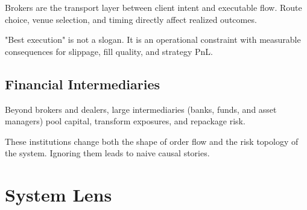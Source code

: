 Brokers are the transport layer between client intent and executable flow. Route choice, venue selection, and timing directly affect realized outcomes.

"Best execution" is not a slogan. It is an operational constraint with measurable consequences for slippage, fill quality, and strategy PnL.

\subsection{Financial Intermediaries}

Beyond brokers and dealers, large intermediaries (banks, funds, and asset managers) pool capital, transform exposures, and repackage risk.

These institutions change both the shape of order flow and the risk topology of the system. Ignoring them leads to naive causal stories.


\section{System Lens}

